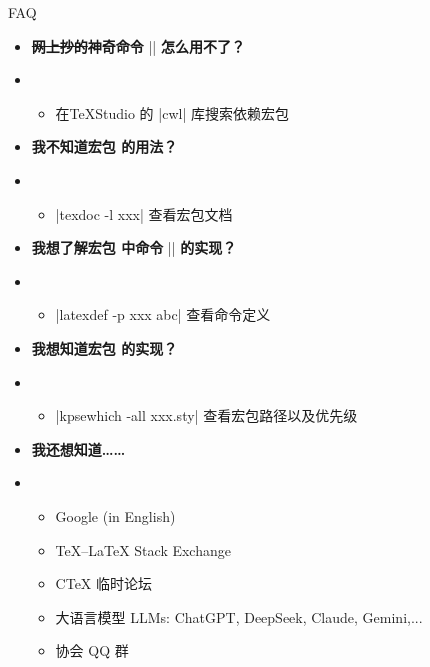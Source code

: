 \begin{frame}[fragile]{FAQ}
  \begin{itemize}
    \item \textbf{ \sout{网上抄的}神奇命令} |\abc| \textbf{怎么用不了？}\pause

    \item[] \begin{itemize}
      \item 在\TeX{}Studio 的 |cwl| 库搜索依赖宏包 
    \end{itemize}\pause

    \item \textbf{ 我不知道宏包  的用法？}\pause

    \item[] \begin{itemize}
      \item |texdoc -l xxx| 查看宏包文档
    \end{itemize}\pause

    \item \textbf{ 我想了解宏包  中命令} |\abc| \textbf{的实现？}\pause

    \item[] \begin{itemize}
      \item |latexdef -p xxx abc| 查看命令定义
    \end{itemize}\pause

    \item \textbf{ 我想知道宏包  的实现？}\pause

    \item[] \begin{itemize}
      \item |kpsewhich -all xxx.sty| 查看宏包路径以及优先级
    \end{itemize}\pause

    \item \textbf{ 我还想知道…… }\pause

    \item[] \begin{itemize}
      \item Google (in English) 
      \item \TeX{}--\LaTeX{} Stack Exchange 
      \item C\TeX{} 临时论坛 
      \item 大语言模型 LLMs: ChatGPT, DeepSeek, Claude, Gemini,...
      \item 协会 QQ 群
    \end{itemize}
  \end{itemize}
\end{frame}



